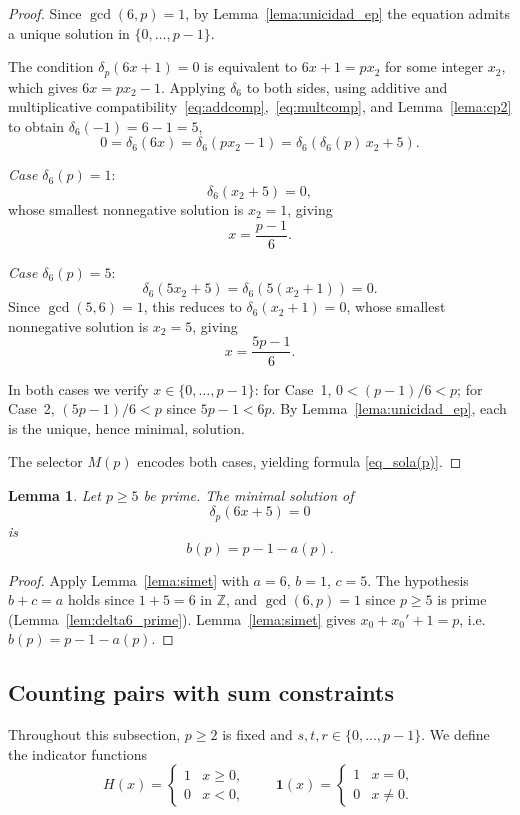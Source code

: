 \documentclass[12pt]{article}
\newtheorem{lemma}[theorem]{Lemma}
\begin{document}
\begin{proof}
Since $\gcd(6,p)=1$, by Lemma~\ref{lema:unicidad_ep} the equation
admits a unique solution in $\{0,\dots,p-1\}$.

The condition $\delta_p(6x+1)=0$ is equivalent to $6x+1=px_2$
for some integer $x_2$, which gives $6x = px_2-1$.
Applying $\delta_6$ to both sides, using additive and multiplicative
compatibility~\eqref{eq:addcomp},~\eqref{eq:multcomp}, and
Lemma~\ref{lema:cp2} to obtain $\delta_6(-1)=6-1=5$,
\[
0 = \delta_6(6x) = \delta_6(px_2-1)
= \delta_6\!\left(\delta_6(p)\,x_2 + 5\right).
\]

\textit{Case $\delta_6(p)=1$}:
\[
\delta_6(x_2+5)=0,
\]
whose smallest nonnegative solution is $x_2=1$, giving
\[
x = \frac{p-1}{6}.
\]

\textit{Case $\delta_6(p)=5$}:
\[
\delta_6(5x_2+5)=\delta_6(5(x_2+1))=0.
\]
Since $\gcd(5,6)=1$, this reduces to $\delta_6(x_2+1)=0$,
whose smallest nonnegative solution is $x_2=5$, giving
\[
x = \frac{5p-1}{6}.
\]

In both cases we verify $x \in \{0,\dots,p-1\}$:
for Case~1, $0 < (p-1)/6 < p$;
for Case~2, $(5p-1)/6 < p$ since $5p-1 < 6p$.
By Lemma~\ref{lema:unicidad_ep}, each is the unique, hence minimal,
solution.

The selector $M(p)$ encodes both cases, yielding formula
\eqref{eq_sola(p)}.
\end{proof}

\begin{lemma}\label{thm:sol_min6_funcional_5}
Let $p \ge 5$ be prime. The minimal solution of
\[
\delta_p(6x+5)=0
\]
is
\[
b(p) = p-1-a(p).
\]
\end{lemma}

\begin{proof}
Apply Lemma~\ref{lema:simet} with $a=6$, $b=1$, $c=5$.
The hypothesis $b+c=a$ holds since $1+5=6$ in $\mathbb{Z}$,
and $\gcd(6,p)=1$ since $p\ge 5$ is prime
(Lemma~\ref{lem:delta6_prime}).
Lemma~\ref{lema:simet} gives $x_0+x_0'+1=p$,
i.e.\ $b(p) = p-1-a(p)$.
\end{proof}


\subsection{Counting pairs with sum constraints}
\label{subsec:counting}

Throughout this subsection, $p \ge 2$ is fixed and
$s,t,r \in \{0,\dots,p-1\}$.
We define the indicator functions
\begin{equation}\label{eq:H_D_def}
H(x)
=
\begin{cases}
1 & x \ge 0,\\
0 & x < 0,
\end{cases}
\qquad
\mathbf{1}(x)
=
\begin{cases}
1 & x=0,\\
0 & x\ne 0.
\end{cases}
\end{equation}
\end{document}
